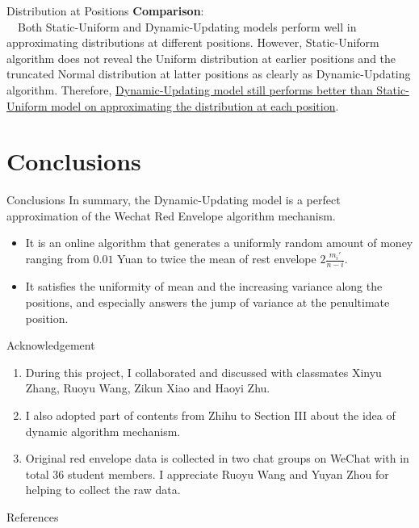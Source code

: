 \documentclass[12pt]{beamer}
\renewcommand{\[}{\begin{equation*} \begin{aligned}} %
\renewcommand{\]}{\end{aligned} \end{equation*}}
\begin{document}
\begin{frame}{Distribution at Positions}
	\textbf{Comparison}: \\
	\ \ Both Static-Uniform and Dynamic-Updating models perform well in approximating distributions at different positions. However, Static-Uniform algorithm does not reveal the Uniform distribution at earlier positions and the truncated Normal distribution at latter positions as clearly as Dynamic-Updating algorithm. Therefore, \uline{Dynamic-Updating model still performs better than Static-Uniform model on approximating the distribution at each position}.
\end{frame}

\section{Conclusions}

\begin{frame}{Conclusions}
	In summary, the Dynamic-Updating model is a perfect approximation of the Wechat Red Envelope algorithm mechanism.
	\begin{itemize}
		\item It is an online algorithm that generates a uniformly random amount of money ranging from $0.01$ Yuan to twice the mean of rest envelope $2\frac{m_i'}{n-i}$.
		\item It satisfies the uniformity of mean and the increasing variance along the positions, and especially answers the jump of variance at the penultimate position.
	\end{itemize}
\end{frame}

\begin{frame}{Acknowledgement}
	\begin{enumerate}
		\item During this project, I collaborated and discussed with classmates Xinyu Zhang, Ruoyu Wang, Zikun Xiao and Haoyi Zhu.
		\item I also adopted part of contents from Zhihu to Section III about the idea of dynamic algorithm mechanism.
		\item Original red envelope data is collected in two chat groups on WeChat with in total 36 student members. I appreciate Ruoyu Wang and Yuyan Zhou for helping to collect the raw data.
	\end{enumerate}
\end{frame}

\begin{frame}{References}
	\scriptsize
	
	
\end{frame}
\end{document}
